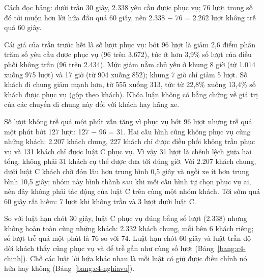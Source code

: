 Cách đọc bảng: dưới trần 30 giây, 2.338 yêu cầu được phục vụ; 76 lượt trong số đó tới muộn hơn lời hứa đầu quá 60
giây, nên 2.338 $-$ 76 = 2.262 lượt không trễ quá 60 giây.

Cái giá của trần trước hết là số lượt phục vụ: bớt 96 lượt là giảm 2,6 điểm phần trăm số yêu cầu được phục vụ (96
trên 3.672), tức ít hơn 3,9\% số lượt của điều phối không trần (96 trên 2.434). Mức giảm nằm chủ yếu ở khung 8 giờ (từ
1.014 xuống 975 lượt) và 17 giờ (từ 904 xuống 852); khung 7 giờ chỉ giảm 5 lượt. Số khách đi chung giảm mạnh hơn, từ
555 xuống 313, tức từ 22,8\% xuống 13,4\% số khách được phục vụ (gộp theo khách). Khóa luận không có bằng chứng về giá
trị của các chuyến đi chung này đối với khách hay hãng xe.

Số lượt không trễ quá một phút vẫn tăng vì phục vụ bớt 96 lượt nhưng trễ quá một phút bớt 127 lượt: 127 $-$ 96 = 31.
Hai cấu hình cũng không phục vụ cùng những khách: 2.207 khách chung, 227 khách chỉ được điều phối không trần phục vụ
và 131 khách chỉ được luật C phục vụ. Vì vậy 31 lượt là chênh lệch giữa hai tổng, không phải 31 khách cụ thể được đưa
tới đúng giờ. Với 2.207 khách chung, dưới luật C khách chờ đón lâu hơn trung bình 0,5 giây và ngồi xe ít hơn trung
bình 10,5 giây; nhóm này hình thành sau khi mỗi cấu hình tự chọn phục vụ ai, nên đây không phải tác động của luật C
trên cùng một nhóm khách. Tới sớm quá 60 giây rất hiếm: 7 lượt khi không trần và 3 lượt dưới luật C.

So với luật hạn chót 30 giây, luật C phục vụ đúng bằng số lượt (2.338) nhưng không hoàn toàn cùng những khách: 2.332
khách chung, mỗi bên 6 khách riêng; số lượt trễ quá một phút là 76 so với 74. Luật hạn chót 60 giây và luật trần độ
dời khách thấy cũng phục vụ và để trễ gần như cùng số lượt (Bảng~\ref{bang:c4-chinh}). Chỗ các luật lời hứa khác nhau
là mỗi luật có giữ được điều chính nó hứa hay không (Bảng~\ref{bang:c4-nghiavu}).

